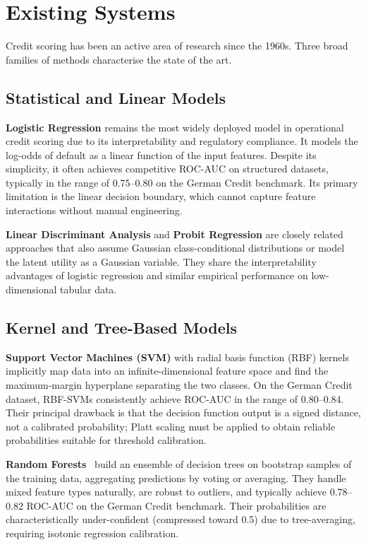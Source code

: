 \documentclass[12pt,a4paper]{article}
\begin{document}
\section{Existing Systems}

Credit scoring has been an active area of research since the 1960s. Three broad families of methods characterise the state of the art.

\subsection{Statistical and Linear Models}

\textbf{Logistic Regression} remains the most widely deployed model in operational credit scoring due to its interpretability and regulatory compliance. It models the log-odds of default as a linear function of the input features. Despite its simplicity, it often achieves competitive ROC-AUC on structured datasets, typically in the range of 0.75--0.80 on the German Credit benchmark. Its primary limitation is the linear decision boundary, which cannot capture feature interactions without manual engineering.

\textbf{Linear Discriminant Analysis} and \textbf{Probit Regression} are closely related approaches that also assume Gaussian class-conditional distributions or model the latent utility as a Gaussian variable. They share the interpretability advantages of logistic regression and similar empirical performance on low-dimensional tabular data.

\subsection{Kernel and Tree-Based Models}

\textbf{Support Vector Machines (SVM)} with radial basis function (RBF) kernels implicitly map data into an infinite-dimensional feature space and find the maximum-margin hyperplane separating the two classes. On the German Credit dataset, RBF-SVMs consistently achieve ROC-AUC in the range of 0.80--0.84. Their principal drawback is that the decision function output is a signed distance, not a calibrated probability; Platt scaling must be applied to obtain reliable probabilities suitable for threshold calibration.

\textbf{Random Forests}~\citep{breiman2001random} build an ensemble of decision trees on bootstrap samples of the training data, aggregating predictions by voting or averaging. They handle mixed feature types naturally, are robust to outliers, and typically achieve 0.78--0.82 ROC-AUC on the German Credit benchmark. Their probabilities are characteristically under-confident (compressed toward 0.5) due to tree-averaging, requiring isotonic regression calibration.
\end{document}
